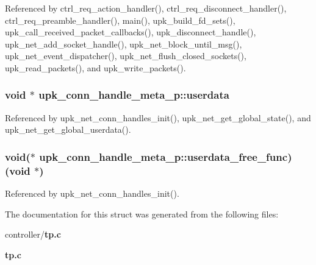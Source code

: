 Referenced by ctrl\_\-req\_\-action\_\-handler(), ctrl\_\-req\_\-disconnect\_\-handler(), ctrl\_\-req\_\-preamble\_\-handler(), main(), upk\_\-build\_\-fd\_\-sets(), upk\_\-call\_\-received\_\-packet\_\-callbacks(), upk\_\-disconnect\_\-handle(), upk\_\-net\_\-add\_\-socket\_\-handle(), upk\_\-net\_\-block\_\-until\_\-msg(), upk\_\-net\_\-event\_\-dispatcher(), upk\_\-net\_\-flush\_\-closed\_\-sockets(), upk\_\-read\_\-packets(), and upk\_\-write\_\-packets().

\subsubsection[{userdata}]{\setlength{\rightskip}{0pt plus 5cm}void $\ast$ {\bf upk\_\-conn\_\-handle\_\-meta\_\-p::userdata}}\label{structupk__conn__handle__meta__p_ae2159d510ba432ff9ff79e7072c27c93}


Referenced by upk\_\-net\_\-conn\_\-handles\_\-init(), upk\_\-net\_\-get\_\-global\_\-state(), and upk\_\-net\_\-get\_\-global\_\-userdata().

\subsubsection[{userdata\_\-free\_\-func}]{\setlength{\rightskip}{0pt plus 5cm}void($\ast$ {\bf upk\_\-conn\_\-handle\_\-meta\_\-p::userdata\_\-free\_\-func})(void $\ast$)}\label{structupk__conn__handle__meta__p_a190d4dbe67e6a0105c0980adc7230ca6}


Referenced by upk\_\-net\_\-conn\_\-handles\_\-init().



The documentation for this struct was generated from the following files:\begin{DoxyCompactItemize}
\item 
controller/{\bf tp.c}\item 
{\bf tp.c}\end{DoxyCompactItemize}
